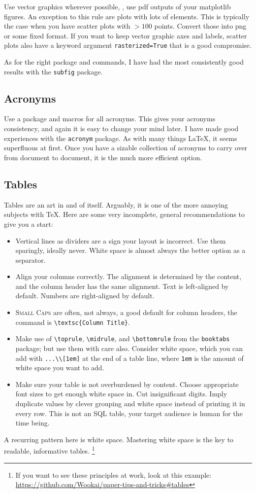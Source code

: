 Use vector graphics wherever possible, \ie, use pdf outputs of your matplotlib figures.
An exception to this rule are plots with lots of elements. 
This is typically the case when you have scatter plots with $>100$ points. 
Convert those into png or some fixed format. 
If you want to keep vector graphic axes and labels, scatter plots also have a keyword argument \verb|rasterized=True| that is a good compromise.

As for the right package and commands, I have had the most consistently good results with the \verb|subfig| package.


\subsection{Acronyms}
Use a package and macros for all acronyms.
This gives your acronyms consistency, and again it is easy to change your mind later.
I have made good experiences with the \verb|acronym| package.
As with many things \LaTeX, it seems superfluous at first.
Once you have a sizable collection of acronyms to carry over from document to document, it is the much more efficient option.


\subsection{Tables}
Tables are an art in and of itself.
Arguably, it is one of the more annoying subjects with \TeX.
Here are some very incomplete, general recommendations to give you a start:
\begin{itemize}
	\item Vertical lines as dividers are a sign your layout is incorrect.
	Use them sparingly, ideally never. 
	White space is almost always the better option as a separator.
	\item Align your columns correctly.
	The alignment is determined by the content, and the column header has the same alignment.
	Text is left-aligned by default.
	Numbers are right-aligned by default.
	\item \textsc{Small Caps} are often, not always, a good default for column headers, the command is \verb|\textsc{Column Title}|.
	\item Make use of \verb|\toprule|, \verb|\midrule|, and \verb|\bottomrule| from the \verb|booktabs| package; but use them with care also.
	Consider white space, which you can add with \verb|...\\[1em]| at the end of a table line, where \verb|1em| is the amount of white space you want to add.
	\item Make sure your table is not overburdened by content. 
	Choose appropriate font sizes to get enough white space in.
	Cut insignificant digits.
	Imply duplicate values by clever grouping and white space instead of printing it in every row.
	This is not an SQL table, your target audience is human for the time being.
\end{itemize}
A recurring pattern here is white space.
Mastering white space is the key to readable, informative tables.%
\footnote{If you want to see these principles at work, look at this example: \url{https://github.com/Wookai/paper-tips-and-tricks\#tables}}

